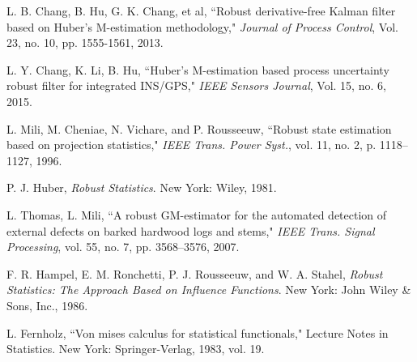 \documentclass[10pt]{IEEEtran}
\begin{document}
\begin{thebibliography}{99}
L. B. Chang, B. Hu, G. K. Chang, et al, ``Robust derivative-free Kalman filter based on Huber's M-estimation methodology," \emph{Journal of Process Control}, Vol. 23, no. 10, pp. 1555-1561, 2013.

L. Y. Chang, K. Li, B. Hu, ``Huber's M-estimation based process uncertainty robust filter for integrated INS/GPS," \emph{IEEE Sensors Journal}, Vol. 15, no. 6, 2015.

L. Mili, M. Cheniae, N. Vichare, and P. Rousseeuw, ``Robust state estimation based on projection statistics," \emph{IEEE Trans. Power Syst.}, vol. 11, no. 2, p. 1118--1127, 1996.

P. J. Huber, \emph{Robust Statistics}. New York: Wiley, 1981.

L. Thomas, L. Mili, ``A robust GM-estimator for the automated detection of external defects on barked hardwood logs and stems," \emph{IEEE Trans. Signal Processing}, vol. 55, no. 7, pp. 3568--3576, 2007.

F. R. Hampel, E. M. Ronchetti, P. J. Rousseeuw, and W. A. Stahel, \emph{Robust Statistics: The Approach Based on Influence Functions}. New York: John Wiley \& Sons, Inc., 1986.

L. Fernholz, ``Von mises calculus for statistical functionals," Lecture Notes in Statistics. New York: Springer-Verlag, 1983, vol. 19.

\end{thebibliography}
\end{document}
